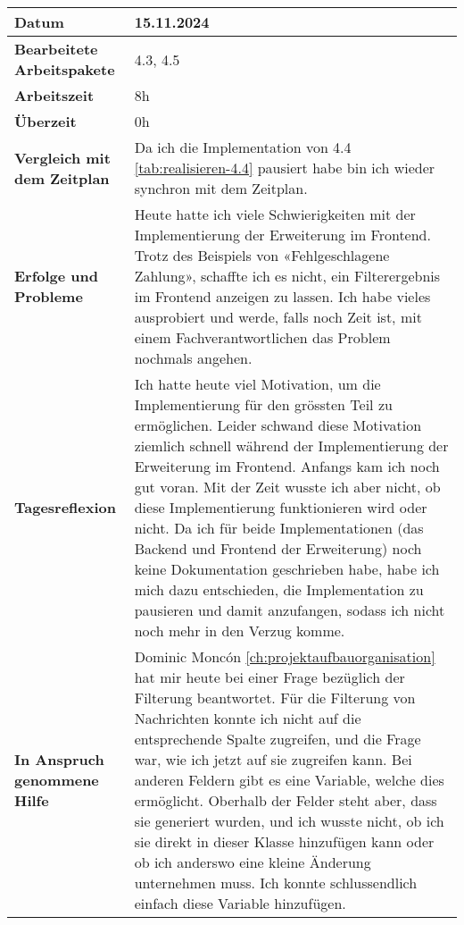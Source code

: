 \begin{longtable}{p{}|p{}}
	\hline
	\textbf{Datum}                       & 15.11.2024            \\
	\hline
	\textbf{Bearbeitete Arbeitspakete}   & 4.3, 4.5                  \\
	\hline
	\textbf{Arbeitszeit}                 & 8h                                    \\
	\hline
	\textbf{Überzeit}                    & 0h                                    \\
	\hline
	\textbf{Vergleich mit dem Zeitplan}  & Da ich die Implementation von 4.4 \ref{tab:realisieren-4.4} pausiert habe bin ich wieder synchron mit dem Zeitplan. \\
	\hline
	\textbf{Erfolge und Probleme} & Heute hatte ich viele Schwierigkeiten mit der Implementierung der Erweiterung im Frontend. Trotz des Beispiels von «Fehlgeschlagene Zahlung», schaffte ich es nicht, ein Filterergebnis im Frontend anzeigen zu lassen. Ich habe vieles ausprobiert und werde, falls noch Zeit ist, mit einem Fachverantwortlichen das Problem nochmals angehen.
	\\
	\hline
	\textbf{Tagesreflexion} & Ich hatte heute viel Motivation, um die Implementierung für den grössten Teil zu ermöglichen. Leider schwand diese Motivation ziemlich schnell während der Implementierung der Erweiterung im Frontend. Anfangs kam ich noch gut voran. Mit der Zeit wusste ich aber nicht, ob diese Implementierung funktionieren wird oder nicht. Da ich für beide Implementationen (das Backend und Frontend der Erweiterung) noch keine Dokumentation geschrieben habe, habe ich mich dazu entschieden, die Implementation zu pausieren und damit anzufangen, sodass ich nicht noch mehr in den Verzug komme.
	\\
	\hline
	\textbf{In Anspruch genommene Hilfe} & Dominic Moncón \ref{ch:projektaufbauorganisation} hat mir heute bei einer Frage bezüglich der Filterung beantwortet. Für die Filterung von Nachrichten konnte ich nicht auf die entsprechende Spalte zugreifen, und die Frage war, wie ich jetzt auf sie zugreifen kann. Bei anderen Feldern gibt es eine Variable, welche dies ermöglicht. Oberhalb der Felder steht aber, dass sie generiert wurden, und ich wusste nicht, ob ich sie direkt in dieser Klasse hinzufügen kann oder ob ich anderswo eine kleine Änderung unternehmen muss. Ich konnte schlussendlich einfach diese Variable hinzufügen.                           \\
	\hline
\end{longtable}\label{tab:arbeitsprotokoll-15.11.2024}
\newpage

